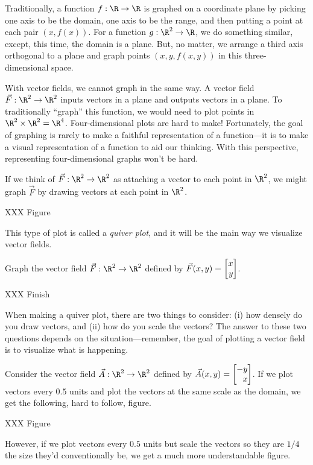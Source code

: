 Traditionally, a function $f:\R\to\R$ is graphed on a coordinate
plane by picking one axis to be the domain, one
axis to be the range, and then putting a point at each pair $(x,f(x))$.
For a function $g:\R^2\to\R$, we do something similar, except, this time,
the domain is a plane.  But, no matter, we arrange a third axis orthogonal
to a plane and graph points $(x,y,f(x,y))$ in this three-dimensional space.

With vector fields, we cannot graph in the same way.  A vector field
$\vec F:\R^2\to\R^2$ inputs vectors in a plane and outputs vectors in
a plane. To traditionally ``graph'' this function, we would need to
plot points in $\R^2\times\R^2=\R^4$.  Four-dimensional plots are hard to make!
Fortunately, the goal of graphing is rarely to make a faithful representation
of a function---it is to make a visual representation of a function
to aid our thinking.  With this perspective, representing four-dimensional
graphs won't be hard.

If we think of $\vec F:\R^2\to\R^2$ as attaching a vector to each point in
$\R^2$, we might graph $\vec F$ by drawing vectors at each point in $\R^2$.

XXX Figure

This type of plot is called a \emph{quiver plot},
and it will be the main way we visualize vector fields.

\begin{example}
	Graph the vector field $\vec F:\R^2\to\R^2$ defined by $\vec F(x,y)=\mat{x\\y}$.

	XXX Finish
\end{example}

When making a quiver plot, there are two things to consider: (i) how
densely do you draw vectors, and (ii) how do you scale the vectors?
The answer to these two questions depends on the situation---remember,
the goal of plotting a vector field is to visualize what is happening.

Consider the vector field $\vec A:\R^2\to\R^2$ defined by $\vec A(x,y)=\mat{-y\\x}$.
If we plot vectors every $0.5$ units and plot the vectors at the same scale
as the domain, we get the following, hard to follow, figure.

XXX Figure

However, if we plot vectors every $0.5$ units but scale the vectors so they are
$1/4$ the size they'd conventionally be, we get a much more understandable figure.


